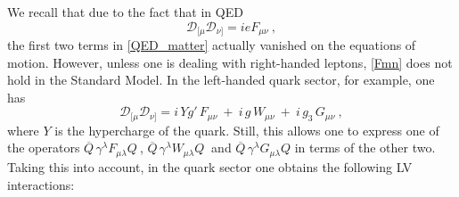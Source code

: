\documentclass[12pt,preprintnumbers,nofootinbib]{revtex4}
\newcommand{\ov}{\overline}
\begin{document}
	We recall that due to the fact that in QED
\begin{equation}
\label{Fmn}
	\mathcal{D}_{[\mu}\mathcal{D}_{\nu]} = i e F_{\mu\nu}~, 
\end{equation} 
	the first two terms in \eqref{QED_matter} actually vanished on 
	the equations of motion.
	However, unless one is dealing with right-handed leptons, 
	\eqref{Fmn} does not hold in the Standard Model.
	In the left-handed quark sector, for example, one has
\begin{equation}
\label{FmnQCD}
	\mathcal{D}_{[\mu}\mathcal{D}_{\nu]} = 
	i\, Y g'\, F_{\mu\nu} ~+~ 
	i\, g\, W_{\mu\nu} ~+~
	i\, g_3\, G_{\mu\nu}~,
\end{equation}
	where $ Y $ is the hypercharge of the quark.
	Still, this allows one to express one of the operators 
$ \ov{Q}\, \gamma^\lambda F_{\mu\lambda} Q~ $,
$ \ov{Q}\, \gamma^\lambda W_{\mu\lambda} Q~ $ and
$ \ov{Q}\, \gamma^\lambda G_{\mu\lambda} Q $
	in terms of the other two.
	Taking this into account, 
	in the quark sector 
	one obtains the following LV interactions:
\end{document}
